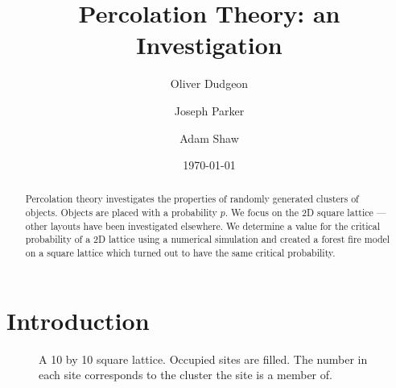 \documentclass[%
 reprint,
 amsmath,amssymb,
 aps,
]{revtex4-2}
\begin{document}

\title{Percolation Theory: an Investigation}%

\author{Oliver Dudgeon}
\author{Joseph Parker}
\author{Adam Shaw}

\date{\today}

\begin{abstract}
Percolation theory investigates the properties of randomly generated clusters of objects. Objects are placed with a probability $p$. We focus on the 2D square lattice --- other layouts have been investigated elsewhere. We determine a value for the critical probability of a 2D lattice using a numerical simulation and created a forest fire model on a square lattice which turned out to have the same critical probability.
\end{abstract}

\maketitle

\section{Introduction}

\begin{figure}
    \centering
    \caption{A 10 by 10 square lattice. Occupied sites are filled. The number in each site corresponds to the cluster the site is a member of. }
    \label{fig:2D_lat}
\end{figure}
\end{document}
